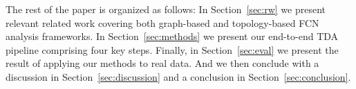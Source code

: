 The rest of the paper is organized as follows: In Section~\ref{sec:rw} we present relevant related work covering both graph-based and topology-based FCN analysis frameworks. In Section~\ref{sec:methods} we present our end-to-end TDA pipeline comprising four key steps. Finally, in Section~\ref{sec:eval} we present the result of applying our methods to real data. And we then conclude with a discussion in Section~\ref{sec:discussion} and a conclusion in Section~\ref{sec:conclusion}.
